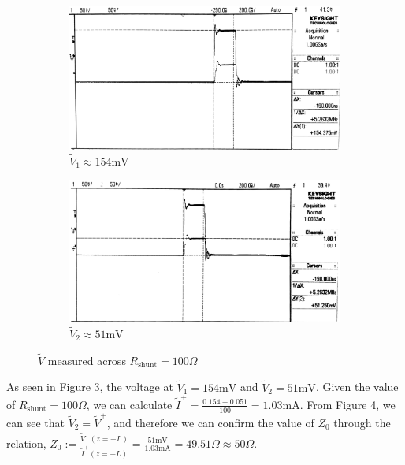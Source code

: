 \documentclass[10pt]{article}
\begin{document}
\begin{figure}[ht]
    \centering
    \begin{subfigure}[b]{0.45\textwidth}
        \includegraphics[width=\textwidth]{../photos/lab1/shunt_delta_v_1.jpg}
        \caption{$\tilde V_1 \approx 154\text{mV}$}
    \end{subfigure}
    \quad
    \begin{subfigure}[b]{0.45\textwidth}
        \includegraphics[width=\textwidth]{../photos/lab1/shunt_delta_v_2.jpg}
        \caption{$\tilde V_2 \approx 51\text{mV}$}
    \end{subfigure}
    \caption{$\tilde V$ measured across $R_\text{shunt} = 100\Omega$\vspace{-0.5cm}}
    \label{delta_v_shunt}
\end{figure}

As seen in Figure 3, the voltage at $\tilde V_1 = 154\text{mV}$ and $\tilde V_2 = 51\text{mV}$. Given the value of $R_\text{shunt} = 100\Omega$,
we can calculate $\tilde I^+ = \frac{0.154-0.051}{100} = 1.03\text{mA}$. From Figure 4, we can see that $\tilde V_2 = \tilde V^+$, and therefore we can confirm the
value of $Z_0$ through the relation, $Z_0 := \frac{\tilde V^+(z=-L)}{\tilde I^+(z=-L)} = \frac{51\text{mV}}{1.03\text{mA}} = 49.51\Omega \approx 50\Omega$.
\end{document}
